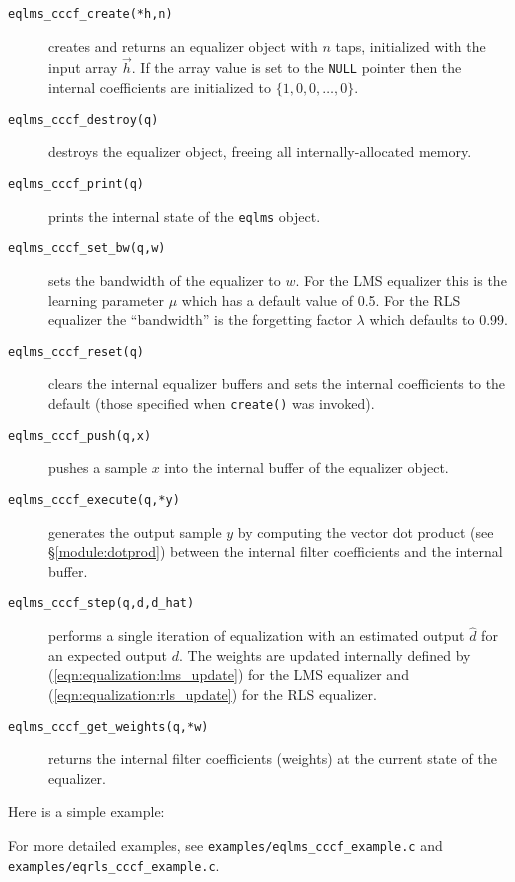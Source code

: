\begin{description}
\item[{\tt eqlms\_cccf\_create(*h,n)}]
    creates and returns an equalizer object with $n$ taps,
    initialized with the input array $\vec{h}$.
    If the array value is set to the {\tt NULL} pointer then the
    internal coefficients are initialized to
    $\{1,0,0,\ldots,0\}$.
\item[{\tt eqlms\_cccf\_destroy(q)}]
    destroys the equalizer object, freeing all internally-allocated
    memory.
\item[{\tt eqlms\_cccf\_print(q)}]
    prints the internal state of the {\tt eqlms} object.
\item[{\tt eqlms\_cccf\_set\_bw(q,w)}]
    sets the bandwidth of the equalizer to $w$.
    For the LMS equalizer this is the learning parameter $\mu$ which has
    a default value of 0.5.
    For the RLS equalizer the ``bandwidth'' is the forgetting factor
    $\lambda$ which defaults to 0.99.
\item[{\tt eqlms\_cccf\_reset(q)}]
    clears the internal equalizer buffers and sets the internal
    coefficients to the default
    (those specified when {\tt create()} was invoked).
\item[{\tt eqlms\_cccf\_push(q,x)}]
    pushes a sample $x$ into the internal buffer of the equalizer
    object.
\item[{\tt eqlms\_cccf\_execute(q,*y)}]
    generates the output sample $y$ by computing the vector dot product
    (see \S\ref{module:dotprod})
    between the internal filter coefficients and the internal buffer.
\item[{\tt eqlms\_cccf\_step(q,d,d\_hat)}]
    performs a single iteration of equalization with an estimated output
    $\hat{d}$ for an expected output $d$.
    The weights are updated internally defined by
    (\ref{eqn:equalization:lms_update}) for the LMS equalizer and
    (\ref{eqn:equalization:rls_update}) for the RLS equalizer.
\item[{\tt eqlms\_cccf\_get\_weights(q,*w)}]
    returns the internal filter coefficients (weights) at the current
    state of the equalizer.
\end{description}
%
Here is a simple example:
%

%
For more detailed examples, see
{\tt examples/eqlms\_cccf\_example.c} and
{\tt examples/eqrls\_cccf\_example.c}.



